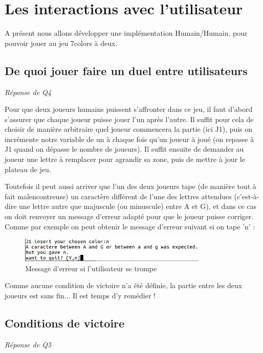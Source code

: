 \documentclass[a4paper,11pt]{article}
\begin{document}
\section{Les interactions avec l'utilisateur}

A présent nous allons développer une implémentation Humain/Humain, pour 
pouvoir jouer au jeu 7colors à deux.

\subsection{De quoi jouer faire un duel entre utilisateurs}
\emph{Réponse de Q4}

Pour que deux joueurs humains puissent s'affronter dans ce jeu, il faut d'abord s'assurer que chaque joueur puisse jouer l'un après l'autre. Il suffit pour cela  de choisir de manière arbitraire quel joueur commencera la partie (ici J1), puis on incrémente notre variable de un à chaque fois qu'un joueur à joué (on repasse à J1 quand on dépasse le nombre de joueurs). Il suffit ensuite de demander au joueur une lettre à remplacer pour agrandir sa zone, puis de mettre à jour le plateau de jeu.

Toutefois il peut aussi arriver que l'un des deux joueurs tape (de manière tout à fait malencontreuse) un caractère différent de l'une des lettres attendues  (c'est-à-dire une lettre autre que majuscule (ou minuscule) entre A et G), et dans ce cas on doit renvoyer un message d'erreur adapté pour que le joueur puisse corriger.
Comme par exemple on peut obtenir le message d'erreur suivant si on tape 'n' :

\begin{figure}[!h]
\begin{center}
\includegraphics[width=0.8\textwidth]{erreur.png}
\caption{Message d'erreur si l'utilisateur se trompe}
\end{center}
\end{figure}
Comme aucune condition de victoire n'a été définie, la partie entre les deux joueurs est sans fin... Il est temps d'y remédier !  


\subsection{Conditions de victoire}
\emph{Réponse de Q5}
\end{document}
